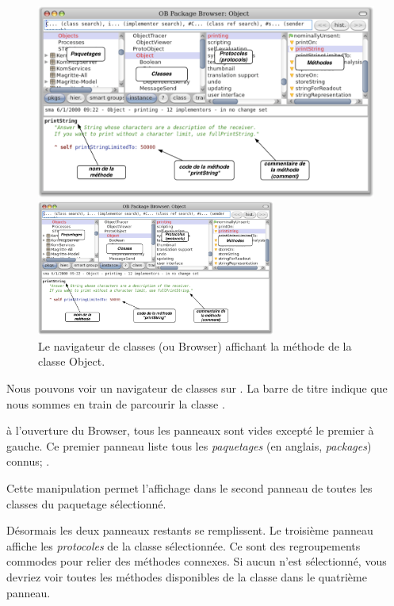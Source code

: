 \documentclass[a4paper,10pt,twoside]{book}
\begin{document}
\begin{figure}[htb]
\ifluluelse
	{\centerline {\includegraphics[width=\textwidth]{ClassBrowser1}}}
	{\centerline {\includegraphics[width=0.7\textwidth]{ClassBrowser1}}}
\caption{Le navigateur de classes (ou Browser) affichant la
  méthode  de la classe Object.
}
\end{figure}

Nous pouvons voir un navigateur de classes sur .
La barre de titre indique que nous sommes en train de parcourir la
classe .

à l'ouverture du Browser, tous les panneaux sont vides excepté
le premier à gauche.
Ce premier panneau liste tous les \emph{paquetages} 
(en anglais, \emph{packages})
connus; .

Cette manipulation permet l'affichage dans le second panneau de toutes les
classes du paquetage sélectionné.

Désormais les deux panneaux restants se remplissent.
Le troisième panneau affiche les \emph{protocoles} de la classe
sélectionnée.
Ce sont des regroupements commodes pour relier des méthodes
connexes. Si aucun  n'est sélectionné, vous devriez
voir toutes les méthodes disponibles de la classe dans le
quatrième panneau.
\end{document}
